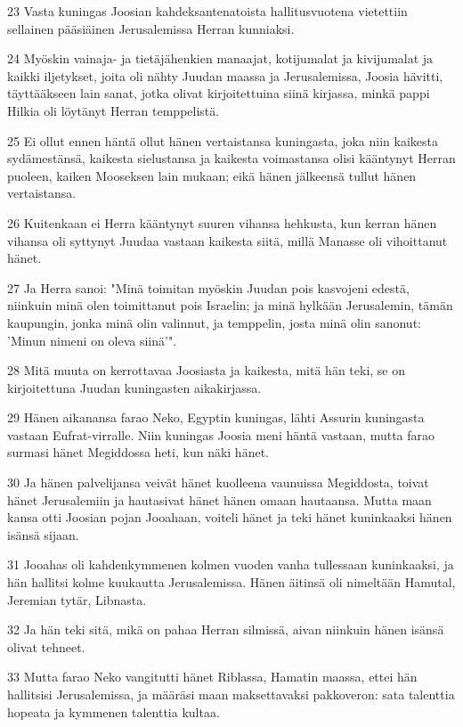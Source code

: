 \par 23 Vasta kuningas Joosian kahdeksantenatoista hallitusvuotena vietettiin sellainen pääsiäinen Jerusalemissa Herran kunniaksi.
\par 24 Myöskin vainaja- ja tietäjähenkien manaajat, kotijumalat ja kivijumalat ja kaikki iljetykset, joita oli nähty Juudan maassa ja Jerusalemissa, Joosia hävitti, täyttääkseen lain sanat, jotka olivat kirjoitettuina siinä kirjassa, minkä pappi Hilkia oli löytänyt Herran temppelistä.
\par 25 Ei ollut ennen häntä ollut hänen vertaistansa kuningasta, joka niin kaikesta sydämestänsä, kaikesta sielustansa ja kaikesta voimastansa olisi kääntynyt Herran puoleen, kaiken Mooseksen lain mukaan; eikä hänen jälkeensä tullut hänen vertaistansa.
\par 26 Kuitenkaan ei Herra kääntynyt suuren vihansa hehkusta, kun kerran hänen vihansa oli syttynyt Juudaa vastaan kaikesta siitä, millä Manasse oli vihoittanut hänet.
\par 27 Ja Herra sanoi: "Minä toimitan myöskin Juudan pois kasvojeni edestä, niinkuin minä olen toimittanut pois Israelin; ja minä hylkään Jerusalemin, tämän kaupungin, jonka minä olin valinnut, ja temppelin, josta minä olin sanonut: 'Minun nimeni on oleva siinä'".
\par 28 Mitä muuta on kerrottavaa Joosiasta ja kaikesta, mitä hän teki, se on kirjoitettuna Juudan kuningasten aikakirjassa.
\par 29 Hänen aikanansa farao Neko, Egyptin kuningas, lähti Assurin kuningasta vastaan Eufrat-virralle. Niin kuningas Joosia meni häntä vastaan, mutta farao surmasi hänet Megiddossa heti, kun näki hänet.
\par 30 Ja hänen palvelijansa veivät hänet kuolleena vaunuissa Megiddosta, toivat hänet Jerusalemiin ja hautasivat hänet hänen omaan hautaansa. Mutta maan kansa otti Joosian pojan Jooahaan, voiteli hänet ja teki hänet kuninkaaksi hänen isänsä sijaan.
\par 31 Jooahas oli kahdenkymmenen kolmen vuoden vanha tullessaan kuninkaaksi, ja hän hallitsi kolme kuukautta Jerusalemissa. Hänen äitinsä oli nimeltään Hamutal, Jeremian tytär, Libnasta.
\par 32 Ja hän teki sitä, mikä on pahaa Herran silmissä, aivan niinkuin hänen isänsä olivat tehneet.
\par 33 Mutta farao Neko vangitutti hänet Riblassa, Hamatin maassa, ettei hän hallitsisi Jerusalemissa, ja määräsi maan maksettavaksi pakkoveron: sata talenttia hopeata ja kymmenen talenttia kultaa.
